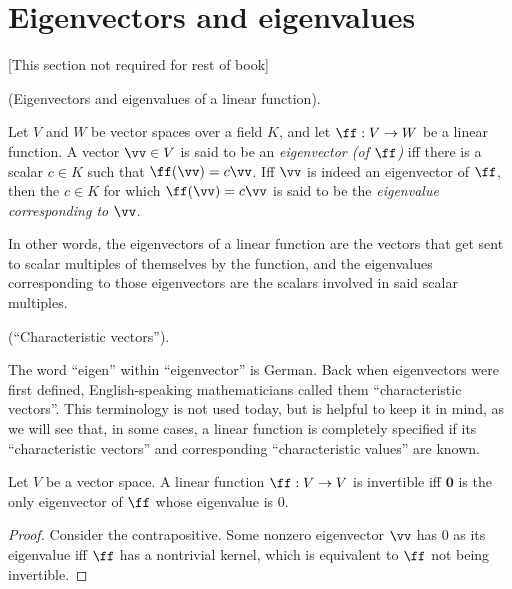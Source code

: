 \newpage

\section{Eigenvectors and eigenvalues}

[This section not required for rest of book]

\begin{defn}
    (Eigenvectors and eigenvalues of a linear function).
    
    Let $V$ and $W$ be vector spaces over a field $K$, and let $\ff:V \rightarrow W$ be a linear function. A vector $\vv \in V$ is said to be an \textit{eigenvector (of $\ff$)} iff there is a scalar $c \in K$ such that $\ff(\vv) = c \vv$. Iff $\vv$ is indeed an eigenvector of $\ff$, then the $c \in K$ for which $\ff(\vv) = c \vv$ is said to be the \textit{eigenvalue corresponding to $\vv$}.
    
    In other words, the eigenvectors of a linear function are the vectors that get sent to scalar multiples of themselves by the function, and the eigenvalues corresponding to those eigenvectors are the scalars involved in said scalar multiples.
\end{defn}

\begin{remark}
    (``Characteristic vectors'').
    
    The word ``eigen'' within ``eigenvector'' is German. Back when eigenvectors were first defined, English-speaking mathematicians called them ``characteristic vectors''. This terminology is not used today, but is helpful to keep it in mind, as we will see that, in some cases, a linear function is completely specified if its ``characteristic vectors'' and corresponding ``characteristic values'' are known.
\end{remark}

\begin{theorem}
    Let $V$ be a vector space. A linear function $\ff:V \rightarrow V$ is invertible iff $\mathbf{0}$ is the only eigenvector of $\ff$ whose eigenvalue is $0$.
\end{theorem}

\begin{proof}
   Consider the contrapositive. Some nonzero eigenvector $\vv$ has $0$ as its eigenvalue iff $\ff$ has a nontrivial kernel, which is equivalent to $\ff$ not being invertible.
\end{proof}

